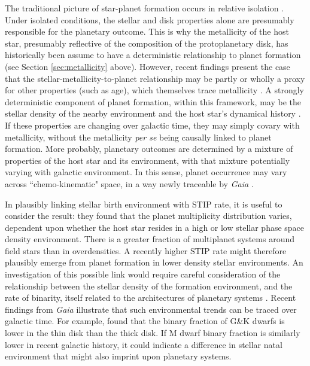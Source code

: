 \documentclass[twocolumn]{aastex631}
\begin{document}
The traditional picture of star-planet formation occurs in relative isolation \citep{armitage_dynamics_2011, williams_protoplanetary_2011, winn_occurrence_2015}. Under isolated conditions, the stellar and disk properties alone are presumably responsible for the planetary outcome. This is why the metallicity of the host star, presumably reflective of the composition of the protoplanetary disk, has historically been assume to have a deterministic relationship to planet formation (see Section \ref{sec:metallicity} above). However, recent findings present the case that the stellar-metallicity-to-planet relationship may be partly or wholly a proxy for other properties (such as age), which themselves trace metallicity  \citep{winter_prevalent_2020, kruijssen_bridging_2020, miyazaki_evidence_2023}. A strongly deterministic component of planet formation, within this framework, may be the stellar density of the nearby environment and the host star's dynamical history \citep{adibekyan_stellar_2021, dai_planet_2021, winter_planet_2024, cai_signatures_2018, kruijssen_bridging_2020}. If these properties are changing over galactic time, they may simply covary with metallicity, without the metallicity \textit{per se} being causally linked to planet formation. More probably, planetary outcomes are determined by a mixture of properties of the host star and its environment, with that mixture potentially varying with galactic environment. In this sense, planet occurrence may vary across ``chemo-kinematic" space, in a way newly traceable by \textit{Gaia} \citep{veyette_chemo-kinematic_2018, carrillo_know_2020}. 

In plausibly linking stellar birth environment with STIP rate, it is useful to consider the \cite{longmore_impact_2021} result: they found that the planet multiplicity distribution varies, dependent upon whether the host star resides in a high or low stellar phase space density environment. There is a greater fraction of multiplanet systems around field stars than in overdensities. A recently higher STIP rate might therefore plausibly emerge from planet formation in lower density stellar environments. An investigation of this possible link would require careful consideration of the relationship between the stellar density of the formation environment, and the rate of binarity, itself related to the architectures of planetary systems \citep{sullivan_revising_2023}. Recent findings from \textit{Gaia} illustrate that such environmental trends can be traced over galactic time. For example, \cite{niu_binary_2021} found that the binary fraction of G\&K dwarfs is lower in the thin disk than the thick disk. If M dwarf binary fraction is similarly lower in recent galactic history, it could indicate a difference in stellar natal environment that might also imprint upon planetary systems.  
\end{document}
